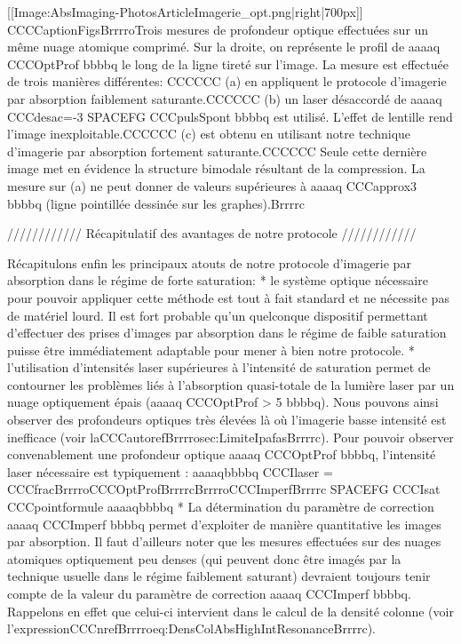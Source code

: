 [[Image:AbsImaging-PhotosArticleImagerie_opt.png|right|700px]]
CCCCaptionFigsBrrrroTrois mesures de profondeur optique effectuées sur un même nuage atomique comprimé. Sur la droite, on représente le profil de aaaaq CCCOptProf bbbbq le long de la ligne tireté sur l'image. La mesure est effectuée de trois manières différentes: CCCCCC
(a) en appliquent le protocole d'imagerie par absorption faiblement saturante.CCCCCC
(b) un laser désaccordé de aaaaq CCCdesac=-3 SPACEFG CCCpulsSpont bbbbq est utilisé. L'effet de lentille rend l'image inexploitable.CCCCCC
(c) est obtenu en utilisant notre technique d'imagerie par absorption fortement saturante.CCCCCC
Seule cette dernière image met en évidence la structure bimodale résultant de la compression. La mesure sur (a) ne peut donner de valeurs supérieures à aaaaq CCCapprox3 bbbbq (ligne pointillée dessinée sur les graphes).Brrrrc



//////////// Récapitulatif des avantages de notre protocole ////////////

Récapitulons enfin les principaux atouts de notre protocole d'imagerie par absorption dans le régime de forte saturation:
	* le système optique nécessaire pour pouvoir appliquer cette méthode est tout à fait standard et ne nécessite pas de matériel lourd. Il est fort probable qu'un quelconque dispositif permettant d'effectuer des prises d'images par absorption dans le régime de faible saturation puisse être immédiatement adaptable pour mener à bien notre protocole. 
	* l'utilisation d'intensités laser supérieures à l'intensité de saturation permet de contourner les problèmes liés à l'absorption quasi-totale de la lumière laser par un nuage optiquement épais (aaaaq CCCOptProf > 5 bbbbq). Nous pouvons ainsi observer des profondeurs optiques très élevées là où l'imagerie basse intensité est inefficace (voir laCCCautorefBrrrrosec:LimiteIpafasBrrrrc). Pour pouvoir observer convenablement une profondeur optique aaaaq CCCOptProf bbbbq, l'intensité laser nécessaire est typiquement : 
aaaaqbbbbq
CCCIlaser = CCCfracBrrrroCCCOptProfBrrrrcBrrrroCCCImperfBrrrrc  SPACEFG  CCCIsat
CCCpointformule
aaaaqbbbbq
	* La détermination du paramètre de correction aaaaq CCCImperf bbbbq permet d'exploiter de manière quantitative les images par absorption. Il faut d'ailleurs noter que les mesures effectuées sur des nuages atomiques optiquement peu denses (qui peuvent donc être imagés par la technique usuelle dans le régime faiblement saturant) devraient toujours tenir compte de la valeur du paramètre de correction aaaaq CCCImperf bbbbq. Rappelons en effet que celui-ci intervient dans le calcul de la densité colonne (voir l'expressionCCCnrefBrrrroeq:DensColAbsHighIntResonanceBrrrrc).








